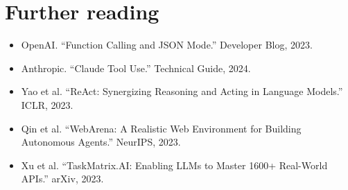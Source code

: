 \documentclass{article}
\begin{document}
\section*{Further reading}
\begin{itemize}
  \item OpenAI. ``Function Calling and JSON Mode.'' Developer Blog, 2023.
  \item Anthropic. ``Claude Tool Use.'' Technical Guide, 2024.
  \item Yao et al. ``ReAct: Synergizing Reasoning and Acting in Language Models.'' ICLR, 2023.
  \item Qin et al. ``WebArena: A Realistic Web Environment for Building Autonomous Agents.'' NeurIPS, 2023.
  \item Xu et al. ``TaskMatrix.AI: Enabling LLMs to Master 1600+ Real-World APIs.'' arXiv, 2023.
\end{itemize}
\end{document}
